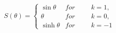 \begin{equation}\label{s}
 S(\theta)=
  \begin{cases}
    \sin\theta & for \hspace{1cm} k=1, \\
    \theta & for \hspace{1cm} k=0,\\
    \sinh\theta & for \hspace{1cm} k=-1
  \end{cases}
\end{equation}

